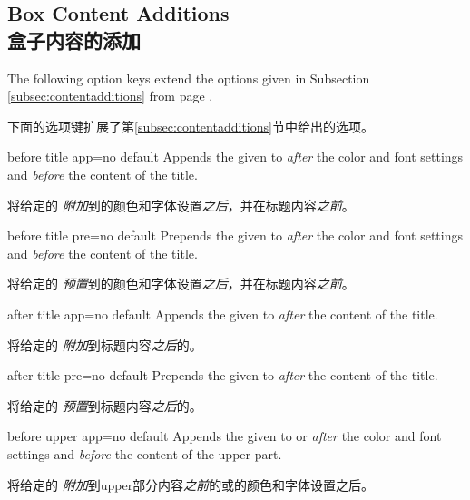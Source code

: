 
\subsection{Box Content Additions\\盒子内容的添加}\label{subsec:hookscontentadditions}
The following option keys extend the options given in Subsection \ref{subsec:contentadditions}
from page \pageref{subsec:contentadditions}.

下面的选项键扩展了第\ref{subsec:contentadditions}节中给出的选项。
\begin{docTcbKey}{before title app}{=}{no default}
Appends the given  to  \emph{after} the color and font settings
and \emph{before} the content of the title.

将给定的 \emph{附加}到的颜色和字体设置\emph{之后}，并在标题内容\emph{之前}。
\end{docTcbKey}

\begin{docTcbKey}{before title pre}{=}{no default}
Prepends the given  to  \emph{after} the color and font settings
and \emph{before} the content of the title.

将给定的 \emph{预置}到的颜色和字体设置\emph{之后}，并在标题内容\emph{之前}。
\end{docTcbKey}

\begin{docTcbKey}{after title app}{=}{no default}
Appends the given  to  \emph{after} the content of the title.

将给定的 \emph{附加}到标题内容\emph{之后}的。
\end{docTcbKey}

\begin{docTcbKey}{after title pre}{=}{no default}
Prepends the given  to  \emph{after} the content of the title.

将给定的 \emph{预置}到标题内容\emph{之后}的。
\end{docTcbKey}

\begin{docTcbKey}{before upper app}{=}{no default}
Appends the given  to  or  \emph{after} the color and font settings
and \emph{before} the content of the upper part.

将给定的 \emph{附加}到upper部分内容\emph{之前}的或的颜色和字体设置之后。
\end{docTcbKey}

